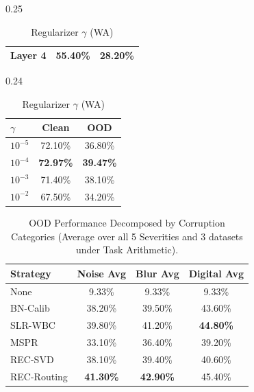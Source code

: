 \documentclass{article}
\theoremstyle{plain}
\theoremstyle{definition}
\theoremstyle{remark}
\begin{document}
\begin{table}[t]
\begin{center}
\begin{footnotesize}
\begin{sc}
\begin{subtable}{0.25\textwidth}
\begin{tabular}{lcc}
Layer 4       & 55.40\%          & 28.20\% \\
\bottomrule
\end{tabular}
\caption{Routing Layer (WA)}
\label{tab:layer_routing}
\end{subtable}
\hfill
\begin{subtable}{0.24\textwidth}
\centering
\begin{tabular}{lcc}
\toprule
$\gamma$ & Clean & OOD \\
\midrule
$10^{-5}$    & 72.10\%       & 36.80\% \\
$10^{-4}$    & \textbf{72.97\%} & \textbf{39.47\%} \\
$10^{-3}$    & 71.40\%       & 38.10\% \\
$10^{-2}$    & 67.50\%       & 34.20\% \\
\bottomrule
\end{tabular}
\caption{Regularizer $\gamma$ (WA)}
\label{tab:slr_gamma}
\end{subtable}
\end{sc}
\end{footnotesize}
\end{center}
\vskip -0.1in
\end{table}

\begin{table}[t]
\caption{OOD Performance Decomposed by Corruption Categories (Average over all 5 Severities and 3 datasets under Task Arithmetic).}
\label{tab:categories}
\vskip 0.06in
\begin{center}
\begin{small}
\begin{sc}
\begin{tabular}{lccc}
\toprule
Strategy & Noise Avg & Blur Avg & Digital Avg \\
\midrule
None       & 9.33\%  & 9.33\%  & 9.33\% \\
BN-Calib   & 38.20\% & 39.50\% & 43.60\% \\
SLR-WBC    & 39.80\% & 41.20\% & \textbf{44.80\%} \\
MSPR       & 33.10\% & 36.40\% & 39.20\% \\
REC-SVD    & 38.10\% & 39.40\% & 40.60\% \\
REC-Routing & \textbf{41.30\%} & \textbf{42.90\%} & 45.40\% \\
\bottomrule
\end{tabular}
\end{sc}
\end{small}
\end{center}
\vskip -0.1in
\end{table}
\end{document}
